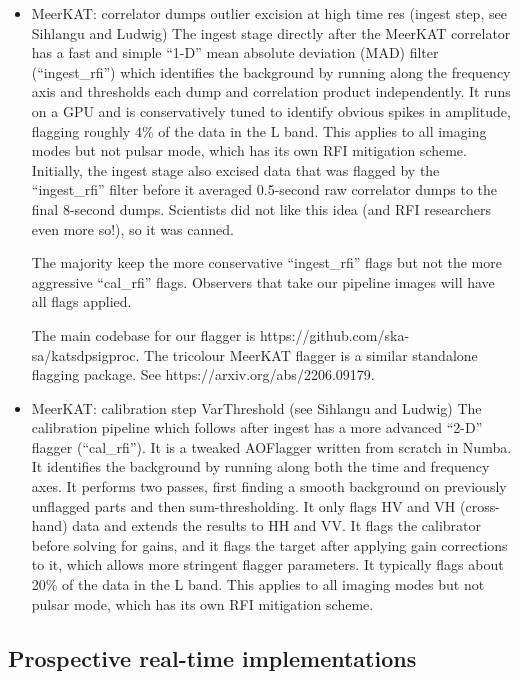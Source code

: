 \begin{itemize}
\item MeerKAT: correlator dumps outlier excision at high time res (ingest step, see Sihlangu and Ludwig)
The ingest stage directly after the MeerKAT correlator has a fast and simple “1-D” mean absolute deviation (MAD) filter (“ingest\_rfi”) which identifies the background by running along the frequency axis and thresholds each dump and correlation product independently. It runs on a GPU and is conservatively tuned to identify obvious spikes in amplitude, flagging roughly 4\% of the data in the L band. This applies to all imaging modes but not pulsar mode, which has its own RFI mitigation scheme.
Initially, the ingest stage also excised data that was flagged by the “ingest\_rfi” filter before it averaged 0.5-second raw correlator dumps to the final 8-second dumps. Scientists did not like this idea (and RFI researchers even more so!), so it was canned.

The majority keep the more conservative “ingest\_rfi” flags but not the more aggressive “cal\_rfi” flags. Observers that take our pipeline images will have all flags applied.

The main codebase for our flagger is https://github.com/ska-sa/katsdpsigproc. The tricolour MeerKAT flagger is a similar standalone flagging package. See https://arxiv.org/abs/2206.09179.


\item MeerKAT: calibration step VarThreshold  (see Sihlangu and Ludwig)
The calibration pipeline which follows after ingest has a more advanced “2-D” flagger (“cal\_rfi”). It is a tweaked AOFlagger written from scratch in Numba. It identifies the background by running along both the time and frequency axes. It performs two passes, first finding a smooth background on previously unflagged parts and then sum-thresholding. It only flags HV and VH (cross-hand) data and extends the results to HH and VV. It flags the calibrator before solving for gains, and it flags the target after applying gain corrections to it, which allows more stringent flagger parameters. It typically flags about 20\% of the data in the L band. This applies to all imaging modes but not pulsar mode, which has its own RFI mitigation scheme.


\end{itemize}

\subsection{Prospective real-time implementations}
\label{subsection:hardware:catalog:prospective}

